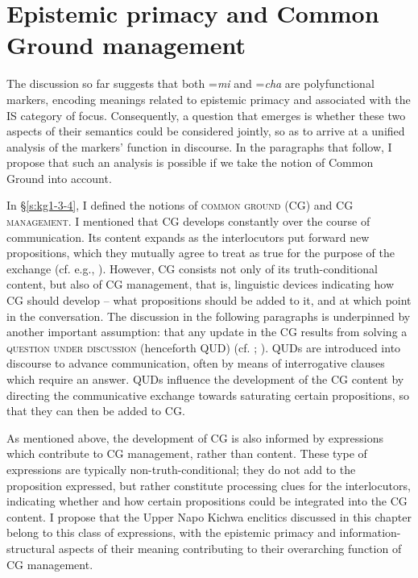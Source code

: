 \documentclass[output=paper]{langscibook}
\begin{document}
\section{Epistemic primacy and Common Ground management}\label{s:kg5}

The discussion so far suggests that both =\textit{mi} and =\textit{cha} are polyfunctional markers, encoding meanings related to epistemic primacy and associated with the IS category of focus. Consequently, a question that emerges is whether these two aspects of their semantics could be considered jointly, so as to arrive at a unified analysis of the markers' function in discourse. In the paragraphs that follow, I propose that such an analysis is possible if we take the notion of Common Ground into account.

In §‎\ref{s:kg1-3-4}, I defined the notions of \textsc{common ground} (CG) and CG \textsc{management}. I mentioned that CG develops constantly over the course of communication. Its content expands as the interlocutors put forward new propositions, which they mutually agree to treat as true for the purpose of the exchange (cf. e.g., \citealt{Stalnaker1974}). However, CG consists not only of its truth-conditional content, but also of CG management, that is, linguistic devices indicating how CG should develop – what propositions should be added to it, and at which point in the conversation. The discussion in the following paragraphs is underpinned by another important assumption: that any update in the CG results from solving a \textsc{question under discussion} (henceforth QUD) (cf. \citealt{Asher1993}; \citealt{Matic2015}). QUDs are introduced into discourse to advance communication, often by means of interrogative clauses which require an answer. QUDs influence the development of the CG content by directing the communicative exchange towards saturating certain propositions, so that they can then be added to CG.

As mentioned above, the development of CG is also informed by expressions which contribute to CG management, rather than content. These type of expressions are typically non-truth-conditional; they do not add to the proposition expressed, but rather constitute processing clues for the interlocutors, indicating whether and how certain propositions could be integrated into the CG content. I propose that the Upper Napo Kichwa enclitics discussed in this chapter belong to this class of expressions, with the epistemic primacy and information-structural aspects of their meaning contributing to their overarching function of CG management.
\end{document}
